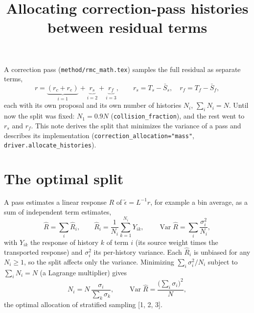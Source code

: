 \documentclass[11pt]{article}
\title{Allocating correction-pass histories between residual terms}
\date{}
\newcommand{\teps}{\tilde\epsilon}
\newcommand{\Sbar}{\bar S}
\begin{document}
\maketitle

\noindent A correction pass (\texttt{method/rmc\_math.tex}) samples the full residual as
separate terms,
\begin{equation}
  r = \underbrace{(r_c + r_e)}_{i=1} + \underbrace{r_s}_{i=2} + \underbrace{r_f}_{i=3},
  \qquad r_s = T_s - \Sbar_s,\quad r_f = T_f - \Sbar_f ,
\end{equation}
each with its own proposal and its own number of histories $N_i$,
$\sum_i N_i = N$. Until now the split was fixed: $N_1 = 0.9N$
(\texttt{collision\_fraction}), and the rest went to $r_s$ and $r_f$. This note derives
the split that minimizes the variance of a pass and describes its implementation
(\texttt{correction\_allocation="mass"}, \texttt{driver.allocate\_histories}).

\section{The optimal split}

A pass estimates a linear response $R$ of $\teps = L^{-1}r$, for example a bin average,
as a sum of independent term estimates,
\begin{equation}
  \hat R = \sum_i \hat R_i,\qquad
  \hat R_i = \frac{1}{N_i}\sum_{k=1}^{N_i} Y_{ik},\qquad
  \operatorname{Var}\hat R = \sum_i \frac{\sigma_i^2}{N_i},
\end{equation}
with $Y_{ik}$ the response of history $k$ of term $i$ (its source weight times the
transported response) and $\sigma_i^2$ its per-history variance. Each $\hat R_i$ is
unbiased for any $N_i\ge1$, so the split affects only the variance. Minimizing
$\sum_i\sigma_i^2/N_i$ subject to $\sum_iN_i=N$ (a Lagrange multiplier) gives
\begin{equation}
  N_i = N\,\frac{\sigma_i}{\sum_k\sigma_k},\qquad
  \operatorname{Var}\hat R = \frac{\big(\sum_i\sigma_i\big)^2}{N},
  \label{eq:neyman}
\end{equation}
the optimal allocation of stratified sampling [1, 2, 3].
\end{document}
